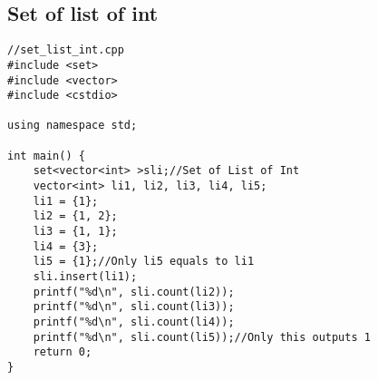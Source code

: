 \documentclass{article}
\begin{document}
\subsection{Set of list of int}
\begin{lstlisting}
//set_list_int.cpp
#include <set>
#include <vector>
#include <cstdio>

using namespace std;

int main() {
    set<vector<int> >sli;//Set of List of Int
    vector<int> li1, li2, li3, li4, li5;
    li1 = {1};
    li2 = {1, 2};
    li3 = {1, 1};
    li4 = {3};
    li5 = {1};//Only li5 equals to li1
    sli.insert(li1);
    printf("%d\n", sli.count(li2));
    printf("%d\n", sli.count(li3));
    printf("%d\n", sli.count(li4));
    printf("%d\n", sli.count(li5));//Only this outputs 1
    return 0;
}
\end{lstlisting}
\end{document}
